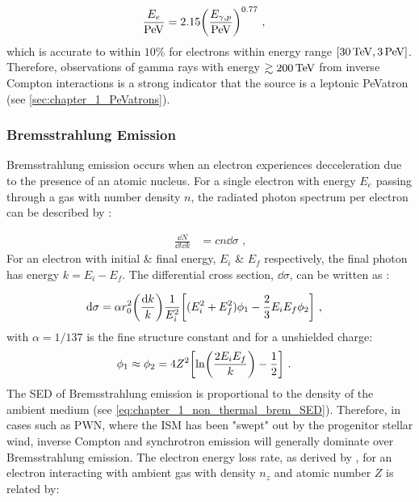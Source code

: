 \begin{equation}
    \begin{aligned}
    \frac{E_e}{\PeV}&=2.15 \qty(\frac{E_{\gamma,p}}{\PeV})^{0.77}\text{ ,}
    \end{aligned}
\end{equation}
which is accurate to within $10\%$ for electrons within energy range $[30\,\TeV,3\,\PeV]$. Therefore, observations of gamma rays with energy $\gtrsim 200\,\TeV$ from inverse Compton interactions is a strong indicator that the source is a leptonic PeVatron (see \autoref{sec:chapter_1_PeVatrons}).

\subsubsection{Bremsstrahlung Emission}

Bremsstrahlung emission occurs when an electron experiences decceleration due to the presence of an atomic nucleus. For a single electron with energy $E_e$ passing through a gas with number density $n$, the radiated photon spectrum per electron can be described by \citep{RevModPhys.42.237}:

\begin{equation}
	\begin{split}
		\frac{\dd{N}}{\dd{t}\dd{k}}&=cn\dd{\sigma} \text{ ,}
	\end{split} \label{eq:chapter_1_non_thermal_brem_SED}
\end{equation}
\noindent For an electron with initial \& final energy, $E_i$ \& $E_f$ respectively, the final photon has energy $k=E_i-E_f$. The differential cross section, $\dd{\sigma}$, can be written as \citep{1934RSPSA.146...83B}:

\begin{equation}
	\begin{split}
		\dd{\sigma}&=\alpha r_0^2\qty(\frac{\dd{k}}{k})\frac{1}{E_i^2}\qty[(E_i^2+E_f^2)\phi_1-\frac{2}{3}E_i E_f\phi_2]\text{ ,} \label{eq:chapter_1_non_thermal_brem_cross_section} 
	\end{split}
\end{equation}
\noindent with $\alpha=1/137$ is the fine structure constant and for a unshielded charge:
\begin{equation}
    \begin{aligned}
        \phi_1&\approx\phi_2=4Z^2\qty[\ln(\frac{2E_iE_f}{k})-\frac{1}{2}]\text{ .}
    \end{aligned}
\end{equation}
\newpar
The SED of Bremsstrahlung emission is proportional to the density of the ambient medium (see \autoref{eq:chapter_1_non_thermal_brem_SED}). Therefore, in cases such as PWN, where the ISM has been "swept" out by the progenitor stellar wind, inverse Compton and synchrotron emission will generally dominate over Bremsstrahlung emission. The electron energy loss rate, as derived by \cite{RevModPhys.42.237}, for an electron interacting with ambient gas with density $n_z$ and atomic number $Z$ is related by:

